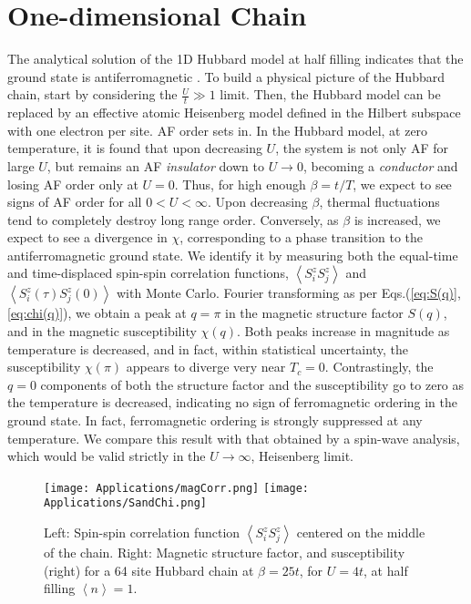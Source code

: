 \section{One-dimensional Chain}
\label{sec:1d-chain}

The analytical solution of the \acs{1D} Hubbard model at half filling indicates that the ground state is antiferromagnetic \cite{lieb_absence_1968}.
To build a physical picture of the Hubbard chain, start by considering the $\frac{U}{t} \gg 1$ limit. 
Then, the Hubbard model can be replaced by an effective atomic Heisenberg model defined in the Hilbert subspace with one electron per site.
\ac{AF} order sets in.
In the Hubbard model, at zero temperature, it is found that upon decreasing $U$, the system is not only \acs{AF} for large $U$, but remains an \acs{AF} \emph{insulator} down to $U \rightarrow 0$, becoming a \emph{conductor} and losing \acs{AF} order only at $U = 0$.
Thus, for high enough $\beta = t / T$, we expect to see signs of \acs{AF} order for all $0 < U < \infty$.
Upon decreasing $\beta$, thermal fluctuations tend to completely destroy long range order.
Conversely, as $\beta$ is increased, we expect to see a divergence in $\chi$, corresponding to a phase transition to the antiferromagnetic ground state.
We identify it by measuring both the equal-time and time-displaced spin-spin correlation functions, $\left\langle S^z_i  S^z_j \right\rangle$ and $\left\langle S^z_i (\tau) S^z_j (0) \right\rangle$ with Monte Carlo.
Fourier transforming as per Eqs.(\ref{eq:S(q)},\ref{eq:chi(q)}), we obtain a peak at $q = \pi$ in the magnetic structure factor $S ( q ) $, and in the magnetic susceptibility $\chi (q)$.
Both peaks increase in magnitude as temperature is decreased, and in fact, within statistical uncertainty, the  susceptibility $\chi (\pi)$ appears to diverge very near $T_c = 0$.
Contrastingly, the $q = 0$ components of both the structure factor and the susceptibility go to zero as the temperature is decreased, indicating  no sign of ferromagnetic ordering in the ground state.
In fact, ferromagnetic ordering is strongly suppressed at any temperature.
We compare this result with that obtained by a spin-wave analysis, which would be valid strictly in the $U \rightarrow \infty$, Heisenberg limit.
\begin{figure}[H]\label{fig:corr_FT}
\texttt{[image: Applications/magCorr.png]}
\hspace{-0.5cm}
\texttt{[image: Applications/SandChi.png]}
\caption[Spin-spin correlation function, magnetic structure factor, and susceptibility for a 64 site Hubbard chain at $\beta = 25 t$, for $U = 4$.]{Left: Spin-spin correlation function $\left\langle S^z_i S^z_j \right\rangle$ centered on the middle of the chain.
Right: Magnetic structure factor, and susceptibility (right) for a 64 site Hubbard chain at $\beta = 25 t$, for $U = 4t$, at half filling $\left\langle n \right\rangle = 1$.}
\end{figure}
